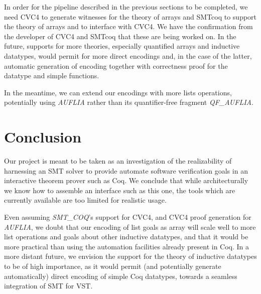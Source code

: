 \documentclass[onecolumn, preprint]{sigplanconf}
\begin{document}
In order for the pipeline described in the previous sections to be completed, we need CVC4 to generate witnesses for the theory of arrays and SMTcoq to support the theory of arrays and to interface with CVC4. We have the confirmation from the developer of CVC4 and SMTcoq that these are being worked on. In the future, supports for more theories, especially quantified arrays and inductive datatypes, would permit for more direct encodings and, in the case of the latter, automatic generation of encoding together with correctness proof for the datatype and simple functions.


In the meantime, we can extend our encodings with more lists operations, potentially using \emph{AUFLIA} rather than its quantifier-free fragment \emph{QF\_AUFLIA}.

\section{Conclusion}
\label{sec:conclusion}
Our project is meant to be taken as an investigation of the realizability of harnessing an SMT solver to provide automate software verification goals in an interactive theorem prover such as Coq. We conclude that while architecturally we know how to assemble an interface such as this one, the tools which are currently available are too limited for realistic usage.




Even assuming \emph{SMT\_COQ}'s support for CVC4, and CVC4 proof generation for \emph{AUFLIA}, we doubt that our encoding of list goals as array will scale well to more list operations and goals about other inductive datatypes, and that it would be more practical than using the automation facilities already present in Coq. In a more distant future, we envision the support for the theory of inductive datatypes to be of high importance, as it would permit (and potentially generate automatically)  direct encoding of simple Coq datatypes, towards a seamless integration of SMT for VST.



\end{document}
